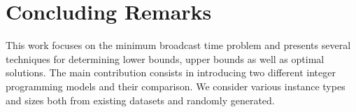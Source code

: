 \section{Concluding Remarks} \label{sec:conc}

This work focuses on the minimum broadcast time problem and presents several techniques for determining lower bounds, upper bounds as well as optimal solutions.
The main contribution consists in introducing two different integer programming models and their comparison.
We consider various instance types and sizes both from existing datasets and randomly generated.

